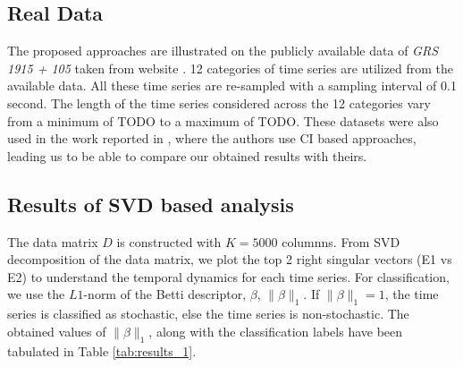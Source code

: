 \documentclass[journal]{IEEEtran}
\begin{document}
	\subsection{Real Data}
	The proposed approaches are illustrated on the publicly available data of \textit{GRS 1915 + 105} taken from website \cite{xte}. 12 categories of time series are utilized from the available data. All these time series are re-sampled with a sampling interval of 0.1 second. The length of the time series considered across the 12 categories vary from a minimum of TODO to a maximum of TODO. These datasets  were  also used in the work reported in \cite{Adegoke2018}, where the authors use CI based approaches, leading us to be able to compare our obtained results with theirs.

	\subsection{Results of SVD based analysis}
	
	
	The data matrix $D$ is constructed with $K=5000$ columnns. From SVD decomposition of the data matrix, we plot the top 2 right singular vectors (E1 vs E2) to understand the temporal dynamics for each time series. For classification, we use the $L1$-norm of the Betti descriptor, $\beta$, $\|\beta\|_1$. If $\|\beta\|_1 = 1$, the time series is classified as stochastic, else the time series is non-stochastic. The obtained values of $\|\beta\|_1$, along with the classification labels have been tabulated in Table \ref{tab:results_1}.
%	
	
\end{document}
